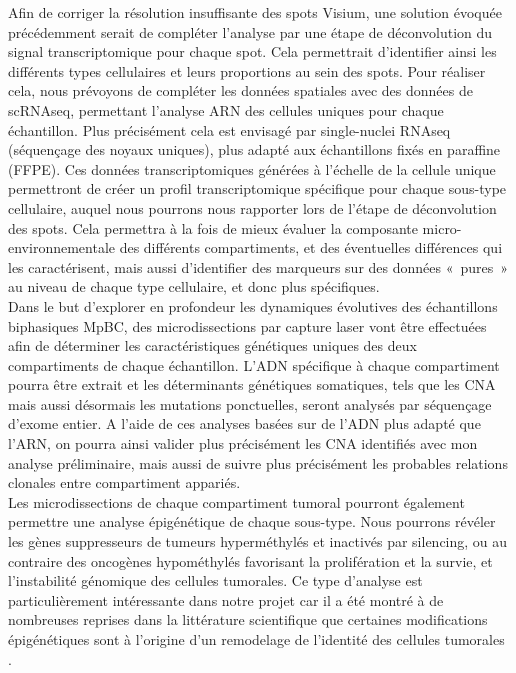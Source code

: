 \documentclass[11pt]{article}
\begin{document}
Afin de corriger la résolution insuffisante des spots Visium, une solution évoquée précédemment serait de compléter l’analyse par une étape de déconvolution du signal transcriptomique pour chaque spot. Cela permettrait d’identifier ainsi les différents types cellulaires et leurs proportions au sein des spots. Pour réaliser cela, nous prévoyons de compléter les données spatiales avec des données de scRNAseq, permettant l’analyse ARN des cellules uniques pour chaque échantillon. Plus précisément cela est envisagé par single-nuclei RNAseq (séquençage des noyaux uniques), plus adapté aux échantillons fixés en paraffine (FFPE). Ces données transcriptomiques générées à l’échelle de la cellule unique permettront de créer un profil transcriptomique spécifique pour chaque sous-type cellulaire, auquel nous pourrons nous rapporter lors de l’étape de déconvolution des spots. Cela permettra à la fois de mieux évaluer la composante micro-environnementale des différents compartiments, et des éventuelles différences qui les caractérisent, mais aussi d’identifier des marqueurs sur des données « pures » au niveau de chaque type cellulaire, et donc plus spécifiques.\\

Dans le but d’explorer en profondeur les dynamiques évolutives des échantillons biphasiques MpBC, des microdissections par capture laser vont être effectuées afin de déterminer les caractéristiques génétiques uniques des deux compartiments de chaque échantillon. L’ADN spécifique à chaque compartiment pourra être extrait et les déterminants génétiques somatiques, tels que les CNA mais aussi désormais les mutations ponctuelles, seront analysés par séquençage d’exome entier. A l’aide de ces analyses basées sur de l’ADN plus adapté que l’ARN, on pourra ainsi valider plus précisément les CNA identifiés avec mon analyse préliminaire, mais aussi de suivre plus précisément les probables relations clonales entre compartiment appariés.  \\

Les microdissections de chaque compartiment tumoral pourront également permettre une analyse épigénétique de chaque sous-type. Nous pourrons révéler les gènes suppresseurs de tumeurs hyperméthylés et inactivés par silencing, ou au contraire des oncogènes hypométhylés favorisant la prolifération et la survie, et l’instabilité génomique des cellules tumorales. Ce type d’analyse est particulièrement intéressante dans notre projet car il a été montré à de nombreuses reprises dans la littérature scientifique que certaines modifications épigénétiques sont à l’origine d’un remodelage de l’identité des cellules tumorales \cite{Gronbaek2007Epigenetic}.\\
\end{document}
